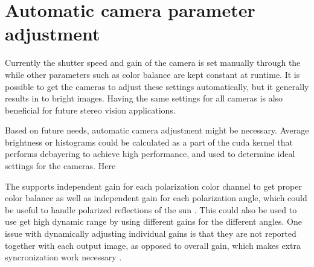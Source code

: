 \section{Automatic camera parameter adjustment}
Currently the shutter speed and gain of the camera is set manually through the \srgui while other parameters such as color balance are kept constant at runtime.
It is possible to get the cameras to adjust these settings automatically, but it generally results in to bright images.
Having the same settings for all cameras is also beneficial for future stereo vision applications.

Based on future needs, automatic camera adjustment might be necessary.
Average brightness or histograms could be calculated as a part of the \gls{cuda} kernel that performs debayering to achieve high performance, and used to determine ideal settings for the cameras.
Here

The \cams supports independent gain for each polarization color channel to get proper color balance as well as independent gain for each polarization angle, which could be useful to handle polarized reflections of the sun \cite{lucidvisionlabsTritonMPPolarized2020}.
This could also be used to use get high dynamic range by using different gains for the different angles.
One issue with dynamically adjusting individual gains is that they are not reported together with each output image, as opposed to overall gain, which makes extra syncronization work necessary \cite{lucidvisionlabsTritonMPPolarized2020}.
